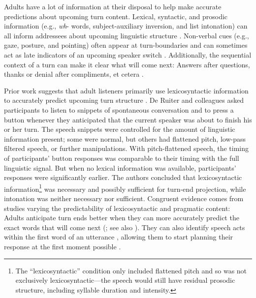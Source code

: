 \documentclass[authoryear, 12pt]{elsarticle}
\begin{document}

Adults have a lot of information at their disposal to help make accurate predictions about upcoming turn content. Lexical, syntactic, and prosodic information (e.g., \textit{wh}- words, subject-auxiliary inversion, and list intonation) can all inform addressees about upcoming linguistic structure \citep{de-ruiter2006, duncan1972, ford1996, torreira2015}. Non-verbal cues (e.g., gaze, posture, and pointing) often appear at turn-boundaries and can sometimes act as late indicators of an upcoming speaker switch \citep{rossano2009, stivers2010}. Additionally, the sequential context of a turn can make it clear what will come next: Answers after questions, thanks or denial after compliments, et cetera \citep{schegloff2007}.

Prior work suggests that adult listeners primarily use lexicosyntactic information to accurately predict upcoming turn structure \citep{de-ruiter2006}. De Ruiter and colleagues \citeyearpar{de-ruiter2006} asked participants to listen to snippets of spontaneous conversation and to press a button whenever they anticipated that the current speaker was about to finish his or her turn. The speech snippets were controlled for the amount of linguistic information present; some were normal, but others had flattened pitch, low-pass filtered speech, or further manipulations. With pitch-flattened speech, the timing of participants' button responses was comparable to their timing with the full linguistic signal. But when no lexical information was available, participants' responses were significantly earlier. The authors concluded that lexicosyntactic information\footnote{The ``lexicosyntactic'' condition only included flattened pitch and so was not exclusively lexicosyntactic---the speech would still have residual prosodic structure, including syllable duration and intensity.} was necessary and possibly sufficient for turn-end projection, while intonation was neither necessary nor sufficient. Congruent evidence comes from studies varying the predictability of lexicosyntactic and pragmatic content: Adults anticipate turn ends better when they can more accurately predict the exact words that will come next (\citealp{magyari2012}; see also \citealp{magyari2014}). They can also identify speech acts within the first word of an utterance \citep{gisladottir2015}, allowing them to start planning their response at the first moment possible \citep{bogels2015}.
\end{document}
